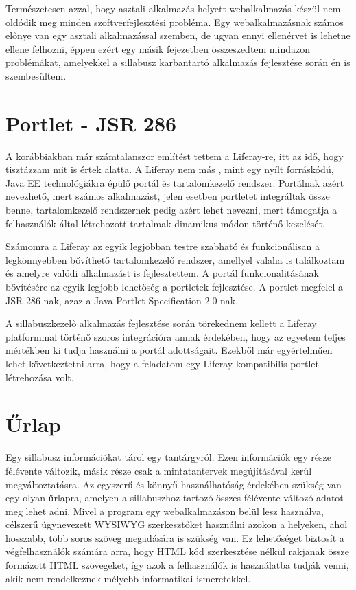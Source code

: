 \documentclass[hidelinks, 12pt, a4paper]{report}
\begin{document}
Természetesen azzal, hogy asztali alkalmazás helyett webalkalmazás készül nem oldódik meg minden szoftverfejlesztési probléma. Egy webalkalmazásnak számos előnye van egy asztali alkalmazással szemben, de ugyan ennyi ellenérvet is lehetne ellene felhozni, éppen ezért egy másik fejezetben összeszedtem mindazon problémákat, amelyekkel a sillabusz karbantartó alkalmazás fejlesztése során én is szembesültem.

\section{Portlet - JSR 286}

A korábbiakban már számtalanszor említést tettem a Liferay-re, itt az idő, hogy tisztázzam mit is értek alatta. A Liferay nem más \cite{liferay-in-action}, mint egy nyílt forráskódú, Java EE technológiákra épülő portál és tartalomkezelő rendszer. Portálnak azért nevezhető, mert számos alkalmazást, jelen esetben portletet integráltak össze benne, tartalomkezelő rendszernek pedig azért lehet nevezni, mert támogatja a felhasználók által létrehozott tartalmak dinamikus módon történő kezelését.

Számomra a Liferay az egyik legjobban testre szabható és funkcionálisan a legkönnyebben bővíthető tartalomkezelő rendszer, amellyel valaha is találkoztam és amelyre valódi alkalmazást is fejlesztettem. A portál funkcionalitásának bővítésére az egyik legjobb lehetőség a portletek fejlesztése. A portlet \cite{jsr286} megfelel a JSR 286-nak, azaz a Java Portlet Specification 2.0-nak.

A sillabuszkezelő alkalmazás fejlesztése során törekednem kellett a Liferay platformmal történő szoros integrációra annak érdekében, hogy az egyetem teljes mértékben ki tudja használni a portál adottságait. Ezekből már egyértelműen lehet következtetni arra, hogy a feladatom egy Liferay kompatibilis portlet létrehozása volt.

\section{Űrlap}

Egy sillabusz információkat tárol egy tantárgyról. Ezen információk egy része félévente változik, másik része csak a mintatantervek megújításával kerül megváltoztatásra. Az egyszerű és könnyű használhatóság érdekében szükség van egy olyan űrlapra, amelyen a sillabuszhoz tartozó összes félévente változó adatot meg lehet adni. Mivel a program egy webalkalmazáson belül lesz használva, célszerű úgynevezett \mbox{WYSIWYG}\footnotemark{} szerkesztőket használni azokon a helyeken, ahol hosszabb, több soros szöveg megadására is szükség van. Ez lehetőséget biztosít a végfelhasználók számára arra, hogy HTML kód szerkesztése nélkül rakjanak össze formázott HTML szövegeket, így azok a felhasználók is használatba tudják venni, akik nem rendelkeznek mélyebb informatikai ismeretekkel.
\end{document}
